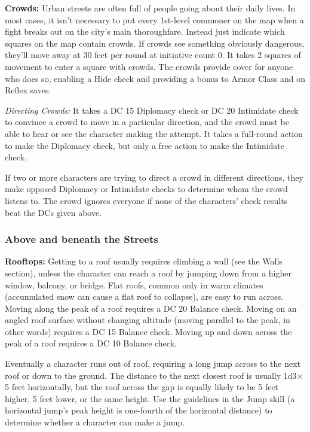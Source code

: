 \documentclass{article}
\begin{document}
\textbf{Crowds: }Urban streets are often full of people going about their daily 
lives. In most cases, it isn't necessary to put every 1st-level commoner on the 
map when a fight breaks out on the city's main thoroughfare. Instead just indicate 
which squares on the map contain crowds. If crowds see something obviously dangerous, 
they'll move away at 30 feet per round at initiative count 0. It takes 2 squares 
of movement to enter a square with crowds. The crowds provide cover for anyone 
who does so, enabling a Hide check and providing a bonus to Armor Class and on 
Reflex saves.

\textit{Directing Crowds: }It takes a DC 15 Diplomacy check or DC 20 Intimidate 
check to convince a crowd to move in a particular direction, and the crowd must 
be able to hear or see the character making the attempt. It takes a full-round 
action to make the Diplomacy check, but only a free action to make the Intimidate 
check.

If two or more characters are trying to direct a crowd in different directions, 
they make opposed Diplomacy or Intimidate checks to determine whom the crowd listens 
to. The crowd ignores everyone if none of the characters' check results beat the 
DCs given above.

\vspace{12pt}
\subsubsection*{\textbf{Above and beneath the Streets}}

\textbf{Rooftops: }Getting to a roof usually requires climbing a wall (see the 
Walls section), unless the character can reach a roof by jumping down from a higher 
window, balcony, or bridge. Flat roofs, common only in warm climates (accumulated 
snow can cause a flat roof to collapse), are easy to run across. Moving along the 
peak of a roof requires a DC 20 Balance check. Moving on an angled roof surface 
without changing altitude (moving parallel to the peak, in other words) requires 
a DC 15 Balance check. Moving up and down across the peak of a roof requires a 
DC 10 Balance check.

Eventually a character runs out of roof, requiring a long jump across to the next 
roof or down to the ground. The distance to the next closest roof is usually 1d3\ensuremath{\times}5 
feet horizontally, but the roof across the gap is equally likely to be 5 feet higher, 
5 feet lower, or the same height. Use the guidelines in the Jump skill\textit{ 
}(a horizontal jump's peak height is one-fourth of the horizontal distance) to 
determine whether a character can make a jump.
\end{document}

